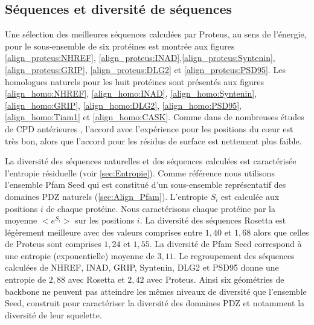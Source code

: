 \subsection{Séquences et diversité de séquences}
Une sélection des meilleures séquences calculées par Proteus, au sens de l'énergie, pour le sous-ensemble de six protéines est montrée aux figures \ref{align_proteus:NHREF}, \ref{align_proteus:INAD},\ref{align_proteus:Syntenin}, \ref{align_proteus:GRIP}, \ref{align_proteus:DLG2} et \ref{align_proteus:PSD95}. Les homologues naturels pour les huit protéines sont présentés aux figures \ref{align_homo:NHREF}, \ref{align_homo:INAD}, \ref{align_homo:Syntenin}, \ref{align_homo:GRIP}, \ref{align_homo:DLG2}, \ref{align_homo:PSD95}, \ref{align_homo:Tiam1} et \ref{align_homo:CASK}. Comme dans de nombreuses études de CPD antérieures \cite{Jaramillo02,Dantas03}, l'accord avec l'expérience pour les positions du cœur est très bon, alors que l'accord pour les résidus de surface est nettement plus faible.

La diversité des séquences naturelles et des séquences calculées est caractérisée l'entropie résiduelle (voir \ref{sec:Entropie}). Comme référence nous utilisons l'ensemble Pfam Seed qui est constitué d'un sous-ensemble représentatif des domaines PDZ naturels (\ref{sec:Align_Pfam}). L'entropie $S_i$ est calculée aux positions $i$ de chaque protéine. Nous caractérisons chaque protéine par la moyenne $<e^{S_i}>$ sur les positions $i$. La diversité des séquences Rosetta est légèrement meilleure avec des valeurs comprises entre $1,40$ et $1,68$ alors que celles de Proteus sont comprises $1,24$ et $1,55$. La diversité de Pfam Seed correspond à une entropie (exponentielle) moyenne de $3,11$. Le regroupement des séquences calculées de NHREF, INAD, GRIP, Syntenin, DLG2 et PSD95 donne une entropie de $2,88$ avec Rosetta et $2,42$ avec Proteus. Ainsi six géométries de backbone ne peuvent pas atteindre les mêmes niveaux de diversité que l'ensemble Seed, construit pour caractériser la diversité des domaines PDZ et notamment la diversité de leur squelette.


